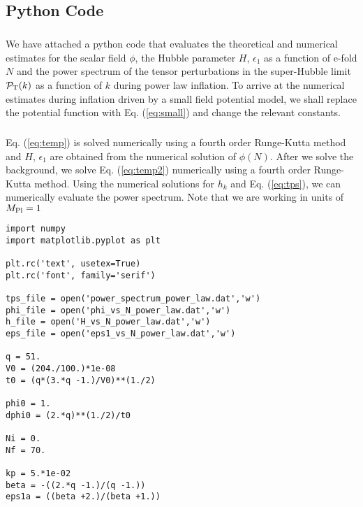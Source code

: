 \documentclass[12pt,a4paper,oneside]{book}
\begin{document}
\begin{appendices}
\chapter{Python Code}

\paragraph*{} We have attached a python code that evaluates the theoretical and numerical estimates for 
the scalar field $\phi$, 
the Hubble parameter $H$, $\epsilon_1$ as a function of e-fold $N$ and the power spectrum of the 
tensor perturbations in the super-Hubble limit ${\mathcal{P}}_{\rm T}(k)$ as a function of $k$ during 
power law inflation. To arrive at the numerical estimates during inflation driven by a small field potential model, 
we shall replace the potential function with Eq. (\ref{eq:small}) and change the relevant constants. 

\paragraph*{} Eq. (\ref{eq:temp}) is solved numerically using a fourth order Runge-Kutta method 
and $H$, $\epsilon_1$ are obtained from the numerical solution of $\phi(N)$. 
After we solve the background, we solve Eq. (\ref{eq:temp2}) numerically using a fourth order Runge-Kutta method. 
Using the numerical solutions for $h_k$ and Eq. (\ref{eq:tps}), we can numerically evaluate the power spectrum. 
Note that we are working in units of $M_{\rm Pl} = 1$

\newpage

\begin{small}
\begin{verbatim}
import numpy
import matplotlib.pyplot as plt

plt.rc('text', usetex=True)
plt.rc('font', family='serif')

tps_file = open('power_spectrum_power_law.dat','w')
phi_file = open('phi_vs_N_power_law.dat','w')
h_file = open('H_vs_N_power_law.dat','w')
eps_file = open('eps1_vs_N_power_law.dat','w')

q = 51.
V0 = (204./100.)*1e-08
t0 = (q*(3.*q -1.)/V0)**(1./2)

phi0 = 1.
dphi0 = (2.*q)**(1./2)/t0

Ni = 0.
Nf = 70. 

kp = 5.*1e-02
beta = -((2.*q -1.)/(q -1.))
eps1a = ((beta +2.)/(beta +1.))


\end{verbatim}
\end{small}
\end{appendices}
\end{document}
